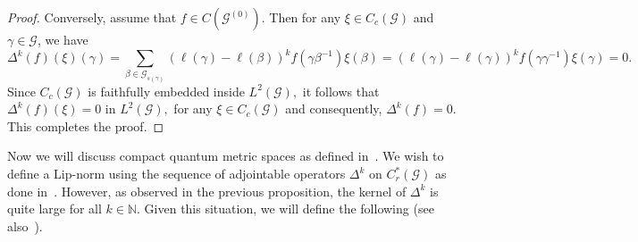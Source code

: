 \documentclass[a4paper,11pt,reqno]{amsart}
\theoremstyle{plain}
\theoremstyle{named}
\numberwithin{equation}{section}
\newcommand{\Bea}{\begin{eqnarray*}}
\newcommand{\Eea}{\end{eqnarray*}}
\begin{document}
\begin{proof}
				Conversely, assume that $f \in C \left (\mathcal G^{(0)} \right ).$ Then for any $\xi \in C_c (\mathcal G)$ and $\gamma \in \mathcal G$, we have
				\[
					\Delta^k (f) (\xi) (\gamma)  =  \sum\limits_{\beta \in \mathcal G_{s(\gamma)}} \left (\ell (\gamma) - \ell (\beta) \right )^k f \left (\gamma \beta^{-1} \right ) \xi (\beta)  =  \left (\ell (\gamma) - \ell (\gamma) \right )^k f \left (\gamma \gamma^{-1} \right ) \xi (\gamma) =  0.
				\] 
			Since $C_c (\mathcal G)$ is faithfully embedded inside $L^2 (\mathcal G),$ it follows that $\Delta^k (f) (\xi) = 0$ in $L^2 (\mathcal G),$ for any $\xi \in C_c (\mathcal G)$ and consequently, $\Delta^k (f) = 0.$ This completes the proof.
			\end{proof}
			
			Now we will discuss compact quantum metric spaces as defined in~\cite{Connes-1989-Compact-metric-sp-Fred-mod-Hyperfinteness,Article}. We wish to define a Lip-norm using the sequence of adjointable operators $\Delta^{k}$ on $C^{\ast}_{r}(\mathcal G)$ as done in~\cite{Long-Wu-2017-Twisted-group-C-alg-as-CQMS}.
			 However, as observed in the previous proposition, the kernel of \(\Delta^{k}\) is quite large for all \(k \in \mathbb{N}\). Given this situation, we will define the following (see also~\cite[Section 3]{Long-Wu-2017-Twisted-group-C-alg-as-CQMS}).
			
\end{document}
